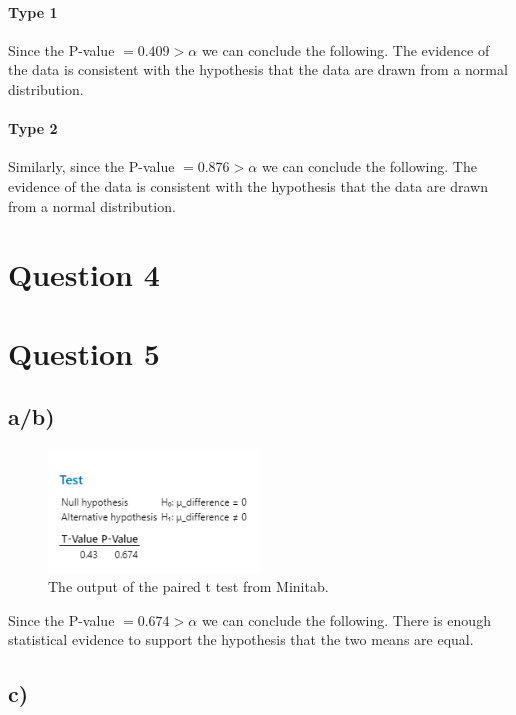 \documentclass{article}
\begin{document}
\paragraph{Type 1} Since the P-value $= 0.409 > \alpha$ we can conclude the following.
    The evidence of the data is consistent with the hypothesis that the data are drawn from a normal distribution.

\paragraph{Type 2} Similarly, since the P-value $= 0.876 > \alpha$ we can conclude the following.
    The evidence of the data is consistent with the hypothesis that the data are drawn from a normal distribution.


\section*{Question 4}

\clearpage
\section*{Question 5}

\subsection*{a/b)}

\begin{figure}[h]
  \centering
  \includegraphics[width=0.5\textwidth]{./images/5_a_1.png}
  \caption{The output of the paired t test from Minitab.}
  \label{fig:5_a}
\end{figure}
Since the P-value $= 0.674 > \alpha$ we can conclude the following.
There is enough statistical evidence to support the hypothesis that the two means are equal.

\subsection*{c)}
\end{document}
